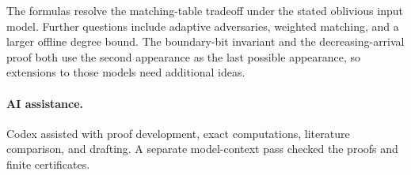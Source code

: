 The formulas resolve the matching-table tradeoff under the stated oblivious
input model. Further questions include adaptive adversaries, weighted
matching, and a larger offline degree bound. The boundary-bit invariant and
the decreasing-arrival proof both use the second appearance as the last
possible appearance, so extensions to those models need additional ideas.

\paragraph{AI assistance.}
Codex assisted with proof development, exact computations, literature
comparison, and drafting. A separate model-context pass checked the proofs
and finite certificates.
